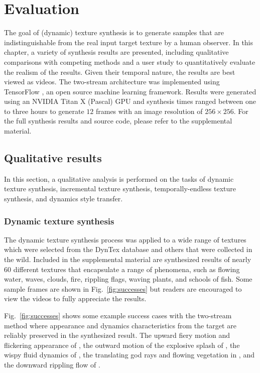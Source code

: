 \chapter{Evaluation}\label{chap:evaluation}

The goal of (dynamic) texture synthesis is to generate 
samples that are indistinguishable from the real input target
texture by a human observer.
In this chapter, a variety of synthesis results are presented,
including qualitative comparisons with competing methods and a user study to quantitatively evaluate the realism
of the results.
Given their temporal nature, the results are best viewed as 
videos.
The two-stream architecture was implemented using TensorFlow
\cite{tabadi2015tensorflowlong}, an open source machine learning framework.
Results were generated using an NVIDIA Titan X (Pascal) GPU
and synthesis times ranged between one to three hours 
to generate $12$ frames with an image resolution of 
$256 \times 256$.
For the full synthesis results and source code, please refer to the
supplemental material. 

\section{Qualitative results}\label{sec:qualitative_results}

In this section, a qualitative analysis is performed on the tasks of dynamic texture synthesis, incremental texture synthesis,
temporally-endless texture synthesis, and dynamics style transfer.

\subsection{Dynamic texture synthesis}

The dynamic texture synthesis process was applied 
to a wide range of textures which were selected from the 
DynTex \cite{peteri2010} database and others that were collected in
the wild.
Included in the supplemental material are synthesized results
of nearly 60 different textures that encapsulate a range of
phenomena, such as flowing water, waves, clouds, fire, rippling
flags, waving plants, and schools of fish.
Some sample frames are shown in Fig.\ \ref{fig:successes}
but readers are encouraged to view the videos to fully appreciate
the results.

Fig.\ \ref{fig:successes} shows some example success cases with the
two-stream method where appearance and dynamics characteristics from the
target are reliably preserved in the synthesized result. The
upward fiery motion and flickering appearance of , the outward
motion of the explosive splash of ,
the wispy fluid dynamics of , the translating god rays and
flowing vegetation in , and the downward 
rippling flow of .


